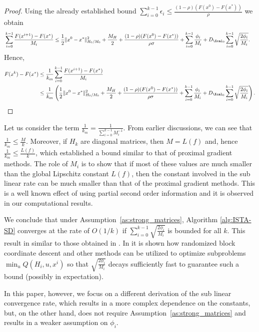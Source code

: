 \documentclass[11pt]{article}
\numberwithin{equation}{section}
\begin{document}
\begin{proof}
         Using the already established bound $\sum_{i=0}^{k-1}\epsilon_i \leq \frac{(1-\rho)(F(x^0)-F(x^*))}{\rho}$ we obtain
          \begin{align*}
         &\sum_{i=0}^{k-1} \frac{F(x^{i+1}) - F(x^*)}{M_i}\leq
         \frac{1}{2} \|x^0-x^*\|_{H_0/M_0}^2 +\frac{M_H}{2}
         + \frac{(1-\rho)(F(x^0)-F(x^*))}{\rho\sigma} 
         + \sum_{i=0}^{k-1}\frac{\phi_i}{M_i}
         + D_{\Xcal_0}\sum_{i=0}^{k-1} \sqrt{\frac{2\phi_i}{M_i}}.
     \end{align*}
     Hence,
     \begin{align*}
         F(x^k) - F(x^*) &\leq \frac{1}{k_m}\sum_{i=0}^{k-1} \frac{F(x^{i+1}) - F(x^*)}{M_i}\\        
         &\leq \frac{1}{k_m} \left( \frac{1}{2} \|x^0-x^*\|_{H_0/M_0}^2 +\frac{M_H}{2}
         + \frac{(1-\rho)(F(x^0)-F(x^*))}{\rho\sigma} 
         + \sum_{i=0}^{k-1}\frac{\phi_i}{M_i}
         + D_{\Xcal_0}\sum_{i=0}^{k-1} \sqrt{\frac{2\phi_i}{M_i}} \right).
     \end{align*}
 \end{proof}

 



Let us consider the term $\frac{1}{k_m}=\frac{1}{\sum_{i=0}^{k-1}M_i^{-1}}$. From earlier discussions, we can see that 
$\frac{1}{k_m}\leq\frac{M}{k}$. Moreover, if $H_k$ are diagonal matrices, then $M=L(f)$ and, hence $\frac{1}{k_m}\leq\frac{L(f)}{k}$,
which established a bound similar to that of proximal gradient methods. The role of $M_i$ is to show that if most of these values are much smaller than the global Lipschitz constant $L(f)$, then the constant involved in the sub linear rate can be much smaller than that of the proximal gradient methods.
This is a  well known effect of using partial second order information and it is observed in our computational results. 

We conclude that under Assumption~\ref{as:strong_matrices},  Algorithm \ref{alg:ISTA-SD} converges at the rate of $O(1/k)$ if 
$\sum_{i=0}^{k-1} \sqrt{\frac{2\phi_i}{M_i}}$ is bounded for all $k$. This result in similar to those obtained in \cite{Schmidtetal}.
In \cite{OML} it is shown how randomized block coordinate descent and other methods can be utilized to optimize subproblems 
$\min_u Q(H_i,u, x^i)$
so that  $\sqrt{\frac{2\phi_i}{M_i}}$ decays sufficiently fast to guarantee  such a bound (possibly in expectation).

In this paper, however, we focus on a different derivation of the sub linear convergence rate, which results in a  more complex dependence on the constants, but, on the other hand, does not require Assumption~\ref{as:strong_matrices}
and results in a weaker assumption on $\phi_i$. 
\end{document}
